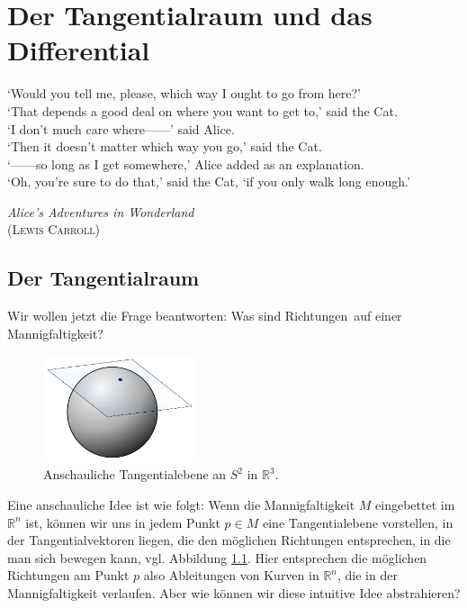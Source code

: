 \documentclass[a4paper]{scrreprt}
\numberwithin{equation}{chapter}
\newcommand{\R}{\mathbb{R}}
\theoremstyle{definition}
\begin{document}
\chapter{Der Tangentialraum und das Differential}
\epigraph{`Would you tell me, please, which way I ought to go from here?'\\
	`That depends a good deal on where you want to get to,' said the Cat.\\
	`I don't much care where------' said Alice.\\
	`Then it doesn't matter which way you go,' said the Cat.\\
	`------so long as I get somewhere,' Alice added as an explanation.\\
	`Oh, you're sure to do that,' said the Cat, `if you only walk long enough.'}
{\emph{Alice's Adventures in Wonderland}\\(\textsc{Lewis Carroll})}

\section{Der Tangentialraum}
Wir wollen jetzt die Frage beantworten: Was sind \glqq Richtungen\grqq\ auf einer Mannigfaltigkeit?

\begin{figure} \label{fig:tngt_plane}
	\centering
	\includegraphics[width=0.4\textwidth]{Image_Tangent-plane}
	\caption{Anschauliche Tangentialebene an $S^2$ in $\R^3$.}
\end{figure}

Eine anschauliche Idee ist wie folgt: Wenn die Mannigfaltigkeit $M$ eingebettet im $\mathbb R^n$ ist, können wir uns in jedem Punkt $p \in M$ eine Tangentialebene vorstellen, in der Tangentialvektoren liegen, die den möglichen Richtungen entsprechen, in die man sich bewegen kann, vgl. Abbildung \ref{fig:tngt_plane}. Hier entsprechen die möglichen Richtungen am Punkt $p$ also Ableitungen von Kurven in $\R^n$, die in der Mannigfaltigkeit verlaufen. Aber wie können wir diese intuitive Idee abstrahieren?
\end{document}
